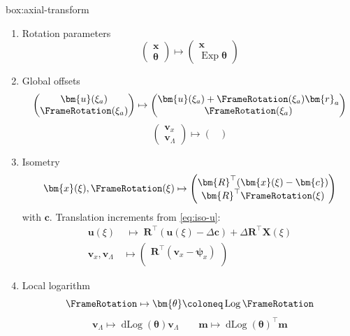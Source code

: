 \begin{ambox}{box:axial-transform}

\small
\begin{enumerate}
    \item Rotation parameters
    \[
    \begin{pmatrix}
    \bm{x} \\
    \bm{\theta} 
    \end{pmatrix}
    \mapsto \begin{pmatrix}
      \bm{x} \\
      \operatorname{Exp} \bm{\theta}
    \end{pmatrix}
    \]
    \item Global offsets 
    \[
    \begin{pmatrix}
    \bm{u}(\xi_a) \\ \FrameRotation(\xi_a) 
    \end{pmatrix}
    \mapsto 
    \begin{pmatrix}
        \bm{u}(\xi_a) + \FrameRotation(\xi_a) \bm{r}_a^{}\\
        \FrameRotation(\xi_a)
    \end{pmatrix}
    \]
    \[
    \begin{pmatrix}
        \bm{v}_x\\ \bm{v}_{\Lambda}
    \end{pmatrix}
    \mapsto 
    \begin{pmatrix}
        
    \end{pmatrix}
    \]

    \item Isometry
    \[
    \bm{x}(\xi),\FrameRotation(\xi) \mapsto \begin{pmatrix}
        \bm{R}^{\top}(\bm{x}(\xi) -\bm{c})\\
        \bm{R}^{\top}\FrameRotation (\xi)
    \end{pmatrix}
    \]
    with \(\bm{c}\). Translation increments from \eqref{eq:iso-u}:
    \[
    \begin{aligned}
    \bm{u}(\xi)&\;\mapsto\; \bm{R}^{\top}(\bm{u}(\xi) - \Delta \bm{c}) + \Delta \bm{R}^{\top}\bm{X}(\xi) \\
    \bm{v}_x,\bm{v}_{\Lambda} &\mapsto \begin{pmatrix}
      \bm{R}^{\top}\left(\bm{v}_x - \bm{\psi}_x \right) \\
    \end{pmatrix}
    \end{aligned}
    \]

    \item Local logarithm
    \[
      \FrameRotation \mapsto \bm{\theta} \coloneq \operatorname{Log} \FrameRotation
    \]
    \[
    \bm{v}_{\Lambda} \mapsto \operatorname{dLog}(\bm{\theta}) \bm{v}_{\Lambda}
    \qquad 
    \bm{m} \mapsto \operatorname{dLog}(\bm{\theta})^{\top} \bm{m}
    \]
\end{enumerate}
\end{ambox}

